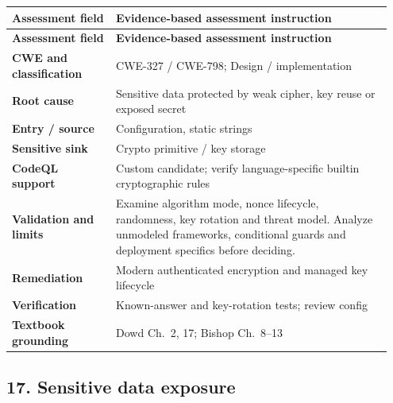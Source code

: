 \documentclass[11pt,letterpaper,oneside]{book}
\begin{document}
\small
\setlength{\tabcolsep}{2pt}
\renewcommand{\arraystretch}{1.18}
\begin{longtable}{>{\raggedright\arraybackslash}p{0.26\linewidth}>{\raggedright\arraybackslash}p{0.69\linewidth}}
\toprule
\textbf{Assessment field} & \textbf{Evidence-based assessment instruction}\\
\midrule
\endfirsthead
\toprule
\textbf{Assessment field} & \textbf{Evidence-based assessment instruction}\\
\midrule
\endhead
\textbf{CWE and classification} & CWE-327 / CWE-798; Design / implementation\\
\textbf{Root cause} & Sensitive data protected by weak cipher, key reuse or exposed secret\\
\textbf{Entry / source} & Configuration, static strings\\
\textbf{Sensitive sink} & Crypto primitive / key storage\\
\textbf{CodeQL support} & Custom candidate; verify language-specific builtin cryptographic rules\\
\textbf{Validation and limits} & Examine algorithm mode, nonce lifecycle, randomness, key rotation and threat model. Analyze unmodeled frameworks, conditional guards and deployment specifics before deciding.\\
\textbf{Remediation} & Modern authenticated encryption and managed key lifecycle\\
\textbf{Verification} & Known-answer and key-rotation tests; review config\\
\textbf{Textbook grounding} & Dowd Ch.~2, 17; Bishop Ch.~8--13\\
\bottomrule
\end{longtable}
\normalsize

\subsection{17. Sensitive data exposure}
\end{document}
